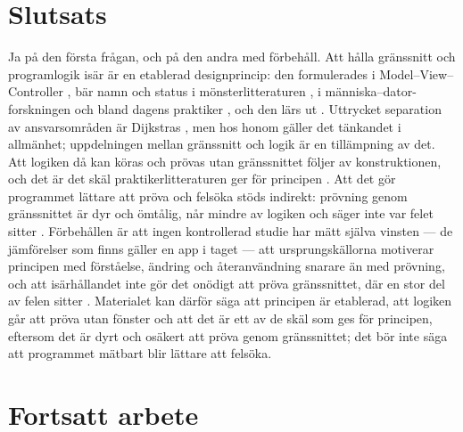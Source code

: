\section{Slutsats}
\label{sec:sep-slutsats-grafik}

Ja på den första frågan, och på den andra med förbehåll.  Att hålla
gränssnitt och programlogik isär är en etablerad designprincip: den
formulerades i Model--View--Controller
\autocite{Reenskaug1979MVC,KrasnerPope1988}, bär namn och status i
mönsterlitteraturen \autocite{Gamma1994DesignPatterns,Potel1996MVP},
i män\-ni\-ska--dator-forskningen \autocite{HartsonHix1989} och bland
dagens praktiker \autocite{Fowler2006SeparatedPresentation,
Verdecchia2019Android}, och den lärs ut \autocite{Tao2002MVC,
HansenFossum2005}.  Uttrycket separation av ansvarsområden är
Dijkstras \autocite{Dijkstra1982Role}, men hos honom gäller det
tänkandet i allmänhet; uppdelningen mellan gränssnitt och logik är en
tillämpning av det.  Att logiken då kan köras och prövas utan
gränssnittet följer av konstruktionen, och det är det skäl
praktikerlitteraturen ger för principen
\autocite{Feathers2002Humble,Meszaros2007Humble,%
Fowler2006GUIArchitectures}.
Att det gör programmet lättare att pröva och felsöka stöds indirekt:
prövning genom gränssnittet är dyr och ömtålig, når mindre av logiken och
säger inte var felet sitter
\autocite{Hellmann2014AGT,Coppola2019Fragility,AlkhalidLabiche2017}.
Förbehållen är att ingen kontrollerad studie har mätt själva vinsten ---
de jämförelser som finns gäller en app i taget
\autocite{Lou2016Android,MagicsVerkman2023iOS} --- att ursprungskällorna
motiverar principen med förståelse, ändring och återanvändning snarare
än med prövning, och att isärhållandet inte gör det onödigt att pröva
gränssnittet, där en stor del av felen sitter
\autocite{RobinsonBrooks2009}.  Materialet kan därför säga att
principen är etablerad, att logiken går att pröva utan fönster och att
det är ett av de skäl som ges för principen, eftersom det är dyrt och
osäkert att pröva genom gränssnittet; det bör inte säga att programmet
mätbart blir lättare att felsöka.

\section{Fortsatt arbete}
\label{sec:sep-fortsatt-grafik}

